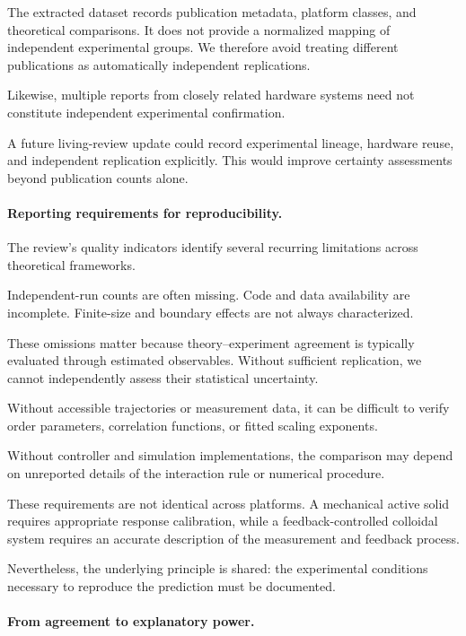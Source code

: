 The extracted
dataset records
publication metadata,
platform classes,
and theoretical
comparisons.
It does not
provide a normalized
mapping of independent
experimental groups.
We therefore
avoid treating
different publications
as automatically
independent
replications.

Likewise,
multiple reports
from closely
related hardware
systems need
not constitute
independent
experimental
confirmation.

A future living-review
update could
record experimental
lineage,
hardware reuse,
and independent
replication explicitly.
This would improve
certainty assessments
beyond publication
counts alone.

\paragraph*{Reporting requirements for reproducibility.}

The review's quality
indicators identify
several recurring
limitations across
theoretical frameworks.

Independent-run
counts are often
missing.
Code and data
availability are
incomplete.
Finite-size
and boundary
effects are
not always
characterized.

These omissions
matter because
theory--experiment
agreement is
typically evaluated
through estimated
observables.
Without sufficient
replication,
we cannot
independently
assess their
statistical
uncertainty.

Without accessible
trajectories or
measurement data,
it can be difficult
to verify order
parameters,
correlation functions,
or fitted
scaling exponents.

Without controller
and simulation
implementations,
the comparison
may depend on
unreported details
of the interaction
rule or numerical
procedure.

These requirements
are not identical
across platforms.
A mechanical
active solid
requires appropriate
response calibration,
while a feedback-controlled
colloidal system
requires an accurate
description of
the measurement
and feedback
process.

Nevertheless,
the underlying
principle is shared:
the experimental
conditions necessary
to reproduce
the prediction
must be documented.

\paragraph*{From agreement to explanatory power.}

